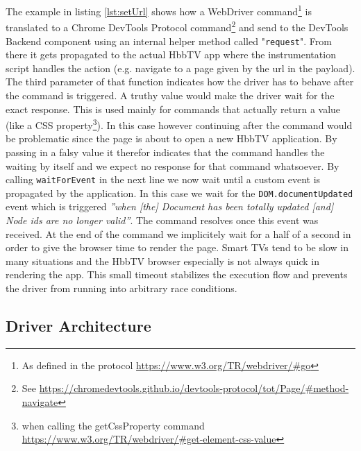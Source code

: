 The example in listing \ref{lst:setUrl} shows how a WebDriver command\footnote{As defined in the protocol
\url{https://www.w3.org/TR/webdriver/\#go}} is translated to a Chrome DevTools Protocol command\footnote{See
\url{https://chromedevtools.github.io/devtools-protocol/tot/Page/\#method-navigate}} and send to the DevTools
Backend component using an internal helper method called "\texttt{request}". From there it gets propagated
to the actual HbbTV app where the instrumentation script handles the action (e.g. navigate to a page given
by the url in the payload). The third parameter of that function indicates how the driver has to behave after
the command is triggered. A truthy value would make the driver wait for the exact response. This is used
mainly for commands that actually return a value (like a CSS property\footnote{when calling the getCssProperty
command \url{https://www.w3.org/TR/webdriver/\#get-element-css-value}}). In this case however continuing after
the command would be problematic since the page is about to open a new HbbTV application. By passing in a falsy
value it therefor indicates that the command handles the waiting by itself and we expect no response for that
command whatsoever. By calling \texttt{waitForEvent} in the next line we now wait until a custom event is
propagated by the application. In this case we wait for the \texttt{DOM.documentUpdated} event which is triggered
\textit{''when [the] Document has been totally updated [and] Node ids are no longer valid''}\cite{devtoolsprotocolDOM}.
The command resolves once this event was received. At the end of the command we implicitely wait for a half of
a second in order to give the browser time to render the page. Smart TVs tend to be slow in many situations and
the HbbTV browser especially is not always quick in rendering the app. This small timeout stabilizes the
execution flow and prevents the driver from running into arbitrary race conditions.

\subsection{Driver Architecture\label{sec:implDriver}}

